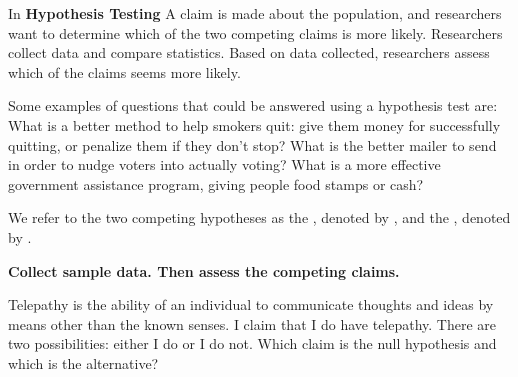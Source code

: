 \pagestyle{fancy}
\renewcommand{\theUnit}{3}
\ifthenelse{\isundefined{\UnitPageNumbers}}{}{\setcounter{page}{1}}
\rhead{Chapter \theUnit: Hypothesis Testing}
\rfoot{\mypage}
\renewcommand{\footrulewidth}{.4pt}
\vspace*{-20pt} \thispagestyle{firstfooter}





In \textbf{Hypothesis Testing}
\bi
\ii A claim is made about the population, and researchers want to determine which of the two competing claims is more likely.
\ii Researchers collect data and compare statistics.
\ii Based on data collected, researchers assess which of the claims seems more likely.
\ei

Some examples of questions that could be answered using a hypothesis test are:
\bi
\ii What is a better method to help smokers quit:  give them money for successfully quitting, or penalize them if they don’t stop?
\ii What is the better mailer to send in order to nudge voters into actually voting?
\ii What is a more effective government assistance program, giving people food stamps or cash?
\ei

\bbox
We refer to the two competing hypotheses as the \textbf{}, denoted by , and the , denoted by .
\bi
\ii {}
\ii {}
\ei

\textbf{Collect sample data. Then assess the competing claims.} 
\ebox


\bb
\ii Telepathy is the ability of an individual to communicate thoughts and ideas by means other than the known senses. I claim that I do have telepathy. There are two possibilities: either I do or I do not. Which claim is the null hypothesis and which is the alternative?  \vfill


